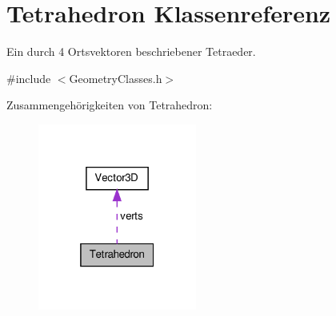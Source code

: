 \hypertarget{classTetrahedron}{\section{Tetrahedron Klassenreferenz}
\label{classTetrahedron}
}


Ein durch 4 Ortsvektoren beschriebener Tetraeder.  




{\ttfamily \#include $<$Geometry\-Classes.\-h$>$}



Zusammengehörigkeiten von Tetrahedron\-:\nopagebreak
\begin{figure}[H]
\begin{center}
\leavevmode
\includegraphics[width=148pt]{classTetrahedron__coll__graph}
\end{center}
\end{figure}
